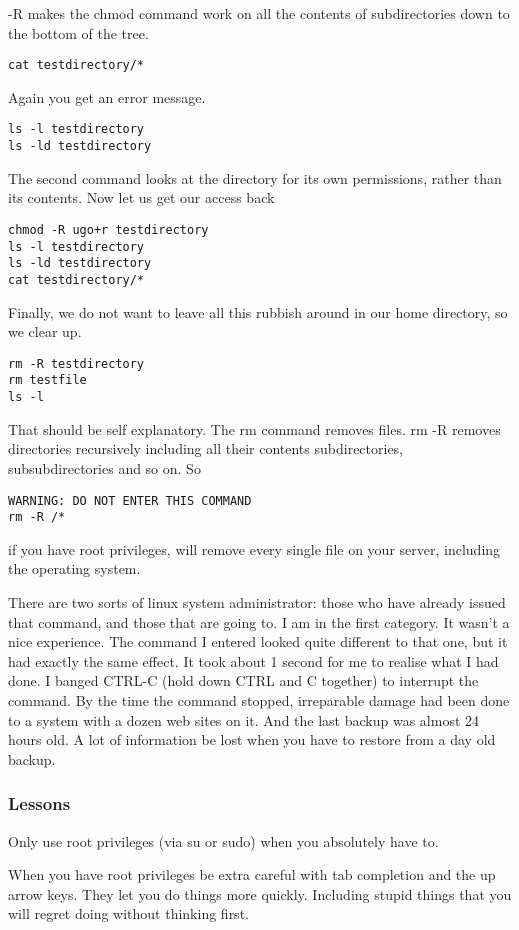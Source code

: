 \documentclass[12pt, a4paper]{article}
\begin{document}
-R makes the chmod command work on all the contents of subdirectories down to the bottom of the tree.  
\begin{verbatim}
cat testdirectory/*
\end{verbatim}
Again you get an error message.
\begin{verbatim}
ls -l testdirectory
ls -ld testdirectory
\end{verbatim}
The second command looks at the directory for its own permissions, rather than its contents.
Now let us get our access back
\begin{verbatim}
chmod -R ugo+r testdirectory
ls -l testdirectory
ls -ld testdirectory
cat testdirectory/*
\end{verbatim}
Finally, we do not want to leave all this rubbish around in our home directory, so we clear up.
\begin{verbatim}
rm -R testdirectory
rm testfile
ls -l
\end{verbatim}
That should be self explanatory. The rm command removes files. rm -R removes directories recursively including all their contents subdirectories, subsubdirectories and so on. 
So
\begin{verbatim}
WARNING: DO NOT ENTER THIS COMMAND
rm -R /*
\end{verbatim}
if you have root privileges, will remove every single file on your server, including the operating system.

There are two sorts of linux system administrator: those who have already issued that command, and those that are going to. I am in the first category. It wasn’t a nice experience. The command I entered looked quite different to that one, but it had exactly the same effect. It took about 1 second for me to realise what I had done. I banged CTRL-C (hold down CTRL and C together) to interrupt the command. By the time the command stopped, irreparable damage had been done to a system with a dozen web sites on it.  And the last backup was almost 24 hours old. A lot of information be lost when you have to restore from a day old backup.

\subsubsection*{Lessons}
Only use root privileges (via su or sudo) when you absolutely have to.

When you have root privileges be extra careful with tab completion and the up arrow keys. They let you do things more quickly. Including stupid things that you will regret doing without thinking first.
\end{document}
